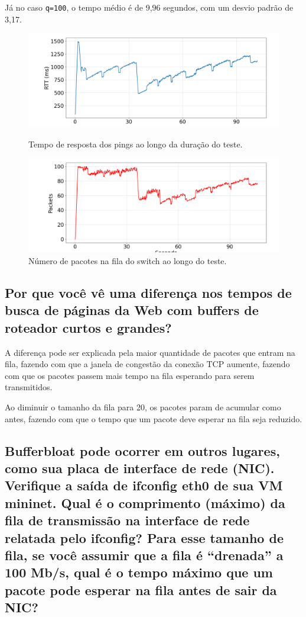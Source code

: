 \documentclass[a4paper,12pt]{article}
\newcommand{\code}[1]{\texttt{#1}}
\begin{document}
\newpage

Já no caso \code{q=100}, o tempo médio é de 9,96 segundos, com um desvio padrão de 3,17.

\begin{figure}[h!]
  \centering
  \includegraphics[width=0.5\columnwidth]{./bufferbloat/reno-rtt-q100.png}
  \caption{Tempo de resposta dos pings ao longo da duração do teste.}
  \includegraphics[width=0.5\columnwidth]{./bufferbloat/reno-buffer-q100.png}
  \caption{Número de pacotes na fila do switch ao longo do teste.}
\end{figure}

\subsection{Por que você vê uma diferença nos tempos de busca de páginas da Web com buffers de roteador curtos e grandes?}

A diferença pode ser explicada pela maior quantidade de pacotes que entram na fila, fazendo com que a janela de congestão da conexão TCP aumente, fazendo com que os pacotes passem mais tempo na fila esperando para serem transmitidos.

Ao diminuir o tamanho da fila para 20, os pacotes param de acumular como antes, fazendo com que o tempo que um pacote deve esperar na fila seja reduzido.

\subsection{Bufferbloat pode ocorrer em outros lugares, como sua placa de interface de rede (NIC). Verifique a saída de ifconfig eth0 de sua VM mininet. Qual é o comprimento (máximo) da fila de transmissão na interface de rede relatada pelo ifconfig? Para esse tamanho de fila, se você assumir que a fila é “drenada” a 100 Mb/s, qual é o tempo máximo que um pacote pode esperar na fila antes de sair da NIC?
}
\end{document}
